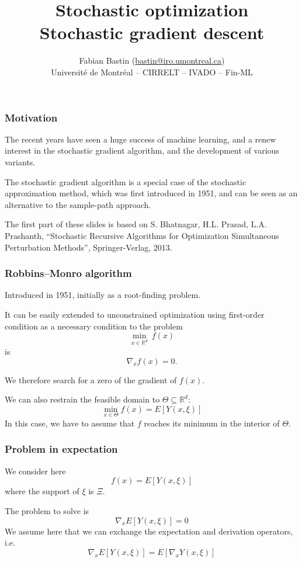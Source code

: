 \documentclass{beamer}
\title[SA vs SAA]{Stochastic optimization\\Stochastic gradient descent}
\author[Fabian Bastin]{Fabian Bastin (\url{bastin@iro.umontreal.ca}) \\ Université de Montréal -- CIRRELT -- IVADO -- Fin-ML}
\date{}
\def\RR{\mathbb{R}}
\begin{document}

\frame{\titlepage}

\begin{frame}
\frametitle{Motivation}

The recent years have seen a huge success of machine learning, and a renew interest in the stochastic gradient algorithm, and the development of various variants.

\mbox{}

The stochastic gradient algorithm is a special case of the stochastic approximation method, which was first introduced in 1951, and can be seen as an alternative to the sample-path approach.

\mbox{}

The first part of these slides is based on
S. Bhatnagar, H.L. Prasad, L.A. Prashanth, ``Stochastic Recursive Algorithms for Optimization
Simultaneous Perturbation Methods'', Springer-Verlag, 2013.

\end{frame}

\begin{frame}
\frametitle{Robbins–Monro algorithm}

Introduced in 1951, initially as a root-finding problem.

\mbox{}

It can be easily extended to unconstrained optimization using first-order condition as a necessary condition to the problem
$$
\min_{x \in \RR^d} \ f(x)
$$
is
$$
\nabla_x f(x) = 0.
$$

\mbox{}

We therefore search for a zero of the gradient of $f(x)$.

\mbox{}

We can also restrain the feasible domain to $\Theta \subseteq \RR^d$:
$$
\min_{x \in \Theta} f(x) = E[Y(x,\xi)]
$$
In this case, we have to assume that $f$ reaches its minimum in the interior of $\Theta$.

\end{frame}

\begin{frame}
\frametitle{Problem in expectation}

We consider here
$$
f(x) = E[Y(x,\xi)]
$$
where the support of $\xi$ is $\Xi$.

\mbox{}

The problem to solve is
$$
\nabla_x E[Y(x,\xi)] = 0
$$
We assume here that we can exchange the expectation and derivation operators, i.e.
$$
\nabla_x E[Y(x,\xi)] = E[\nabla_x Y(x,\xi)]
$$

\end{frame}
\end{document}
